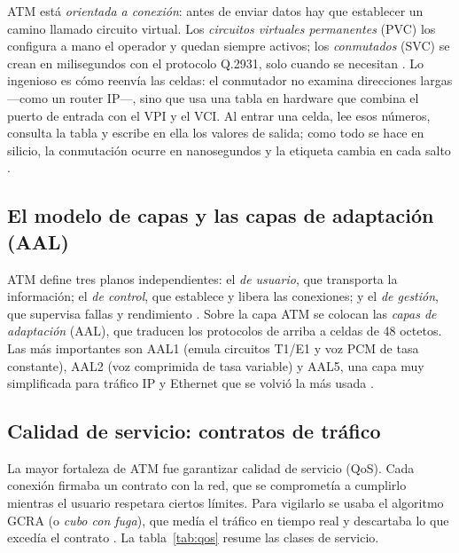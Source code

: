 \documentclass[12pt,a4paper]{article}
\begin{document}
ATM está \emph{orientada a conexión}: antes de enviar datos hay que establecer un camino llamado circuito virtual. Los \emph{circuitos virtuales permanentes} (PVC) los configura a mano el operador y quedan siempre activos; los \emph{conmutados} (SVC) se crean en milisegundos con el protocolo Q.2931, solo cuando se necesitan \cite{ituq2931, deprycker1995}. Lo ingenioso es cómo reenvía las celdas: el conmutador no examina direcciones largas ---como un router IP---, sino que usa una tabla en hardware que combina el puerto de entrada con el VPI y el VCI. Al entrar una celda, lee esos números, consulta la tabla y escribe en ella los valores de salida; como todo se hace en silicio, la conmutación ocurre en nanosegundos y la etiqueta cambia en cada salto \cite{chao2001}.

\subsection{El modelo de capas y las capas de adaptación (AAL)}

ATM define tres planos independientes: el \emph{de usuario}, que transporta la información; el \emph{de control}, que establece y libera las conexiones; y el \emph{de gestión}, que supervisa fallas y rendimiento \cite{itui321}. Sobre la capa ATM se colocan las \emph{capas de adaptación} (AAL), que traducen los protocolos de arriba a celdas de 48 octetos. Las más importantes son AAL1 (emula circuitos T1/E1 y voz PCM de tasa constante), AAL2 (voz comprimida de tasa variable) y AAL5, una capa muy simplificada para tráfico IP y Ethernet que se volvió la más usada \cite{itui363, heinanen1999}.

\subsection{Calidad de servicio: contratos de tráfico}

La mayor fortaleza de ATM fue garantizar calidad de servicio (QoS). Cada conexión firmaba un contrato con la red, que se comprometía a cumplirlo mientras el usuario respetara ciertos límites. Para vigilarlo se usaba el algoritmo GCRA (o \emph{cubo con fuga}), que medía el tráfico en tiempo real y descartaba lo que excedía el contrato \cite{itui371, mcdysan1995}. La tabla~\ref{tab:qos} resume las clases de servicio.
\end{document}
